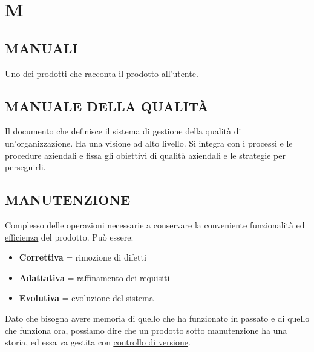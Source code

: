 \newpage
	\section{M} \label{sec:M}

		\subsection{MANUALI}	 \label{manuali}
		Uno dei prodotti che racconta il prodotto all'utente.


		\subsection{MANUALE DELLA QUALITÀ}  \label{manualequalita} %
		Il documento che definisce il sistema di gestione della qualità di un’organizzazione. Ha una visione ad alto livello. Si integra con i processi e le procedure aziendali e fissa gli obiettivi di qualità aziendali e le strategie per perseguirli.


		\subsection{MANUTENZIONE}  \label{manutenzione}
		Complesso delle operazioni necessarie a conservare la conveniente funzionalità ed \underline{\hyperref[efficienza]{efficienza}} del prodotto.
		Può essere:
			\begin{itemize}
				\item \textbf{Correttiva} = rimozione di difetti
				\item \textbf{Adattativa} = raffinamento dei \underline{\hyperref[requirements]{requisiti}}
				\item \textbf{Evolutiva} = evoluzione del sistema
			\end{itemize}
		Dato che bisogna avere memoria di quello che ha funzionato in passato e di quello che funziona ora, possiamo dire che un prodotto sotto manutenzione ha una storia, ed essa va gestita con \underline{\hyperref[controllodiversione]{controllo di versione}}.


